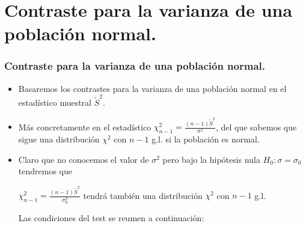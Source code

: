     \section{Contraste para la varianza de una población normal.}

\begin{frame}
    \frametitle{Contraste para la varianza de una población normal.}
    \begin{itemize}
\item Basaremos los contrastes para la varianza de una
    población normal en el estadístico muestral $\tilde{S}^2$.
\item Más concretamente en el estadístico $\chi_{n-1}^2=\frac{(n-1) \tilde{S}^2}{\sigma^2}$,
    del que sabemos que sigue una  distribución $\chi^2$ con $n-1$ g.l.
    si la población es normal.
\item     Claro que no conocemos el valor de $\sigma^2$ pero bajo la hipótesis
    nula $H_{0}:\sigma=\sigma_{0}$  tendremos que

    $\chi_{n-1}^2=\frac{(n-1) \tilde{S}^2}{\sigma_{0}^2}$
    tendrá también una  distribución $\chi^2$ con $n-1$ g.l.

Las condiciones del test se reumen a continuación:
\end{itemize}
\end{frame}

